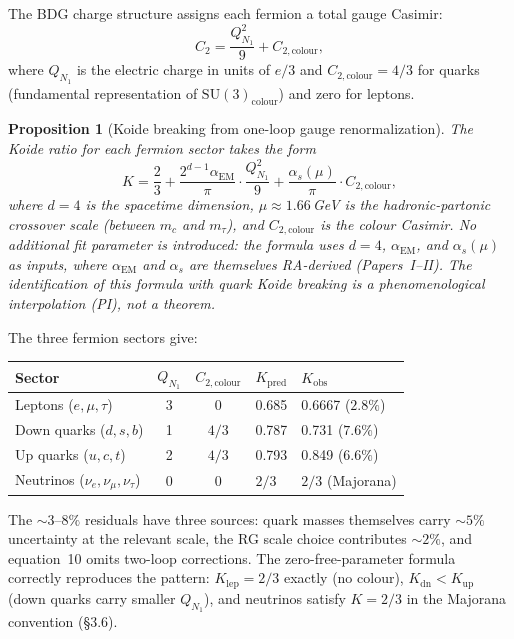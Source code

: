 \documentclass[11pt]{article}
\newtheorem{proposition}{Proposition}
\begin{document}
The BDG charge structure assigns each fermion a total gauge Casimir:
\begin{equation}
C_2 = \frac{Q_{N_1}^2}{9}+C_{2,\mathrm{colour}},
\end{equation}
where $Q_{N_1}$ is the electric charge in units of $e/3$ and $C_{2,\mathrm{colour}}=4/3$ for quarks (fundamental representation of $\mathrm{SU}(3)_{\mathrm{colour}}$) and zero for leptons.

\begin{proposition}[Koide breaking from one-loop gauge renormalization]
\label{prop:koide_breaking}
The Koide ratio for each fermion sector takes the form
\begin{equation}
K = \frac{2}{3} + \frac{2^{d-1}\alpha_{\mathrm{EM}}}{\pi}\cdot\frac{Q_{N_1}^2}{9} + \frac{\alpha_s(\mu)}{\pi}\cdot C_{2,\mathrm{colour}},
\end{equation}
where $d=4$ is the spacetime dimension, $\mu\approx 1.66$\,GeV is the hadronic-partonic crossover scale (between $m_c$ and $m_\tau$), and $C_{2,\mathrm{colour}}$ is the colour Casimir. No additional fit parameter is introduced: the formula uses $d=4$, $\alpha_{\mathrm{EM}}$, and $\alpha_s(\mu)$ as inputs, where $\alpha_{\mathrm{EM}}$ and $\alpha_s$ are themselves RA-derived (Papers~I--II). The identification of this formula with quark Koide breaking is a phenomenological interpolation (PI), not a theorem.
\end{proposition}

The three fermion sectors give:
\begin{center}
\begin{tabular}{lccll}
\toprule
Sector & $Q_{N_1}$ & $C_{2,\mathrm{colour}}$ & $K_{\mathrm{pred}}$ & $K_{\mathrm{obs}}$ \\
\midrule
Leptons ($e,\mu,\tau$) & 3 & 0 & 0.685 & 0.6667 ($2.8\%$) \\
Down quarks ($d,s,b$) & 1 & $4/3$ & 0.787 & 0.731 ($7.6\%$) \\
Up quarks ($u,c,t$) & 2 & $4/3$ & 0.793 & 0.849 ($6.6\%$) \\
Neutrinos ($\nu_e,\nu_\mu,\nu_\tau$) & 0 & 0 & $2/3$ & $2/3$ (Majorana) \\
\bottomrule
\end{tabular}
\end{center}

The $\sim 3$--$8\%$ residuals have three sources: quark masses themselves carry $\sim 5\%$ uncertainty at the relevant scale, the RG scale choice contributes $\sim 2\%$, and equation~10 omits two-loop corrections. The zero-free-parameter formula correctly reproduces the pattern: $K_{\mathrm{lep}}=2/3$ exactly (no colour), $K_{\mathrm{dn}}<K_{\mathrm{up}}$ (down quarks carry smaller $Q_{N_1}$), and neutrinos satisfy $K=2/3$ in the Majorana convention (\S3.6).
\end{document}
